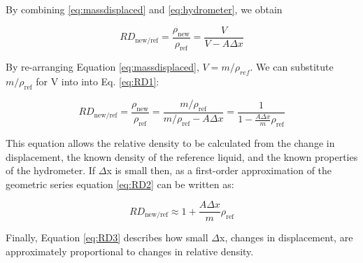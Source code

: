\documentclass{tufte-handout}
\begin{document}
\noindent By combining \ref{eq:massdisplaced} and \ref{eq:hydrometer}, we obtain

\begin{equation}\label{eq:RD1}
RD_{\mathrm{new/ref}} = \frac{\rho_\mathrm{new}}{\rho_\mathrm{ref}} = \frac{V}{V - A \Delta x}
\end{equation}

\noindent By re-arranging Equation \ref{eq:massdisplaced}, $V = m/\rho_{ref}$. We can substitute $m/\rho_\mathrm{ref}$ for V into into Eq. \ref{eq:RD1}:

\begin{equation}\label{eq:RD2}
RD_{\mathrm{new/ref}} = \frac{\rho_\mathrm{new}}{\rho_\mathrm{ref}} = \frac{m/\rho_\mathrm{ref}}{m/\rho_\mathrm{ref} - A \Delta x} = \frac{1}{1 - \frac{A \Delta x}{m} \rho_\mathrm{ref}}
\end{equation}

This equation allows the relative density to be calculated from the change in displacement, the known density of the reference liquid, and the known properties of the hydrometer. If $\Delta$x is small then, as a first-order approximation of the geometric series equation \ref{eq:RD2} can be written as:

\begin{equation}\label{eq:RD3}
RD_\mathrm{new/ref} \approx 1 + \frac{A \Delta x}{m} \rho_\mathrm{ref}
\end{equation}

Finally, Equation \ref{eq:RD3} describes how small $\Delta$x, changes in displacement, are approximately proportional to changes in relative density.


\end{document}
